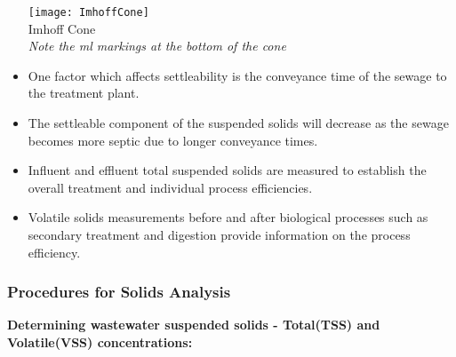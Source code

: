 \begin{itemize}
\begin{minipage}{0.5\textwidth}
			      \end{minipage}	
			      \begin{minipage}{0.5\textwidth}
			      	\begin{center}
			      		\texttt{[image: ImhoffCone]}\\
			      		Imhoff Cone\\
			      		\textit{Note the ml markings at the bottom of the cone}
			      		
			      		
			      	\end{center}
		      \end{minipage}
			      	\item One factor which affects settleability is the conveyance time of the sewage to the treatment plant. 			
			      	\item The settleable component of the suspended solids will decrease as the sewage becomes more septic due to longer conveyance times.
			\item Influent and effluent total suspended solids are measured to establish the overall treatment and individual process efficiencies.  
			\item Volatile solids measurements before and after biological processes such as secondary treatment and digestion provide information on the process efficiency.\\
		\end{itemize}


	\subsubsection{Procedures for Solids Analysis}
	\textbf{Determining wastewater suspended solids - Total(TSS) and Volatile(VSS) concentrations:}\\	
				 
